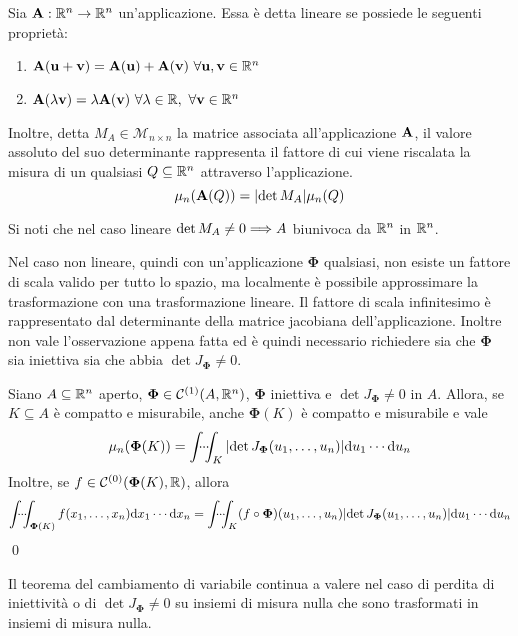 \begin{definition}
    Sia $\vb{A}:\mathbb{R}^n\to\mathbb{R}^n$ un'applicazione. Essa è detta lineare se possiede le seguenti proprietà:
    \begin{enumerate}
        \item $\vb{A}(\vb{u}+\vb{v})=\vb{A}(\vb{u})+\vb{A}(\vb{v}) \ \forall \vb{u},\vb{v}\in \mathbb{R}^n$
        \item $\vb{A}(\lambda\vb{v})=\lambda \vb{A}(\vb{v}) \ \forall \lambda \in \mathbb{R}, \ \forall \vb{v} \in \mathbb{R}^n$ 
    \end{enumerate}
    Inoltre, detta $M_A \in \mathcal{M}_{n\times n}$ la matrice associata all'applicazione $\vb{A}$, il valore assoluto del suo determinante rappresenta il fattore di cui viene riscalata la misura di un qualsiasi $Q\subseteq \mathbb{R}^n$ attraverso l'applicazione.
    $$\mu_n(\vb{A}(Q))=\abs{\det M_A}\mu_n(Q)$$
\end{definition}

\begin{remark}
    Si noti che nel caso lineare $\det M_A \neq 0 \Longrightarrow A$ biunivoca da $\mathbb{R}^n$ in $\mathbb{R}^n$.
\end{remark}

Nel caso non lineare, quindi con un'applicazione $\bm\Phi$ qualsiasi, non esiste un fattore di scala valido per tutto lo spazio, ma localmente è possibile approssimare la trasformazione con una trasformazione lineare. Il fattore di scala infinitesimo è rappresentato dal determinante della matrice jacobiana dell'applicazione. Inoltre non vale l'osservazione appena fatta ed è quindi necessario richiedere sia che $\bm\Phi$ sia iniettiva sia che abbia $\det J_{\bm\Phi} \neq 0$.

\begin{theorem}
    \label{thm:int_var}
    Siano $A \subseteq \mathbb{R}^n$ aperto, $\bm\Phi \in \mathcal{C}^{(1)}(A,\mathbb{R}^n)$, $\bm\Phi$ iniettiva e $\det J_{\bm\Phi} \neq 0$ in $A$. Allora, se $K \subseteq A$ è compatto e misurabile, anche $\bm\Phi(K)$ è compatto e misurabile e vale
    $$
        \mu_n(\bm\Phi(K))=\idotsint_K \abs{\det J_{\bm\Phi}(u_1,\dots,u_n)}\dd u_1 \cdots \dd u_n
    $$
    Inoltre, se $f \in \mathcal{C}^{(0)}(\bm\Phi(K),\mathbb{R})$, allora
    $$
        \idotsint_{\bm\Phi(K)}f(x_1,\dots,x_n)\dd x_1 \cdots \dd x_n=\idotsint_K (f \circ \bm\Phi)(u_1,\dots,u_n)\abs{\det J_{\bm\Phi}(u_1,\dots,u_n)}\dd u_1\cdots \dd u_n
    $$
    \qed
\end{theorem}

\begin{remark}
    Il teorema del cambiamento di variabile continua a valere nel caso di perdita di iniettività o di $\det J_{\bm\Phi}\neq 0$ su insiemi di misura nulla che sono trasformati in insiemi di misura nulla.
\end{remark}

